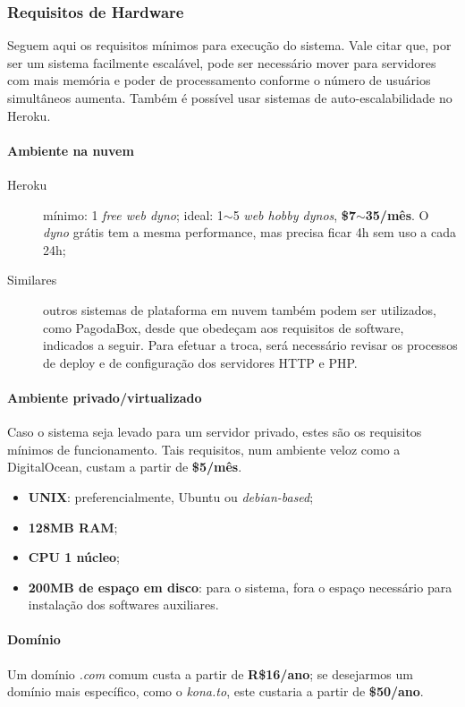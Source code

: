 \documentclass[12pt,a4paper,twoside,hyphens,english,brazil]{abntex2}
\begin{document}
\subsubsection*{Requisitos de Hardware}
Seguem aqui os requisitos mínimos para execução do sistema. Vale citar que, por ser um sistema facilmente escalável, pode ser necessário mover para servidores com mais memória e poder de processamento conforme o número de usuários simultâneos aumenta. Também é possível usar sistemas de auto-escalabilidade no Heroku.

\paragraph*{Ambiente na nuvem}
\begin{description}
	\item[Heroku] mínimo: 1 \emph{free web dyno}; ideal: 1$\sim$5 \emph{web hobby dynos}, \textbf{\$7$\sim$35/mês}. O \emph{dyno} grátis tem a mesma performance, mas precisa ficar 4h sem uso a cada 24h;
	\item[Similares] outros sistemas de plataforma em nuvem também podem ser utilizados, como PagodaBox, desde que obedeçam aos requisitos de software, indicados a seguir. Para efetuar a troca, será necessário revisar os processos de deploy e de configuração dos servidores HTTP e PHP.
\end{description}

\paragraph*{Ambiente privado/virtualizado}
Caso o sistema seja levado para um servidor privado, estes são os requisitos mínimos de funcionamento. Tais requisitos, num ambiente veloz como a DigitalOcean, custam a partir de \textbf{\$5/mês}.
\begin{itemize}
	\item \textbf{UNIX}: preferencialmente, Ubuntu ou \emph{debian-based};
	\item \textbf{128MB RAM};
	\item \textbf{CPU 1 núcleo};
	\item \textbf{200MB de espaço em disco}: para o sistema, fora o espaço necessário para instalação dos softwares auxiliares.
\end{itemize}

\paragraph*{Domínio}
Um domínio \emph{.com} comum custa a partir de \textbf{R\$16/ano}; se desejarmos um domínio mais específico, como o \emph{kona.to}, este custaria a partir de \textbf{\$50/ano}.
\end{document}
